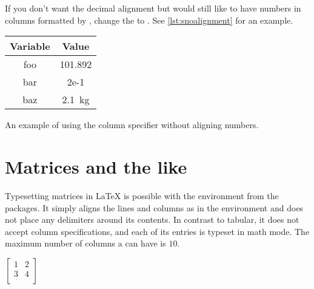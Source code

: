If you don't want the decimal alignment but would still like to have
numbers in columns formatted by , change the
 to . See \autoref{lst:snoalignment}
for an example.
\begin{listing}
  \begin{example}
\begin{tabular}{@{}cS@{}}
  \toprule
  Variable & {Value} \\
  \midrule
  foo & 101.892 \\
  bar & 2e-1 \\
  baz & \qty{2.1}{\kg}  \\
  \bottomrule
\end{tabular}
\end{example}
  \caption{An example of using the  column specifier without aligning
    numbers.}\label{lst:snoalignment}
\end{listing}

\section{Matrices and the like}\label{sec:arraymat}

Typesetting matrices in \LaTeX{} is possible with the 
environment from the  packages. It simply aligns the lines and
columns as in the  environment and does not place any delimiters
around its contents. In contrast to tabular, it does not accept column
specifications, and each of its entries is typeset in math mode. The maximum
number of columns a  can have is \(10\).
\begin{example}
\( \left[
  \begin{matrix}
  1 & 2 \\
  3 & 4 \\
  \end{matrix}
  \right] \)
\end{example}


